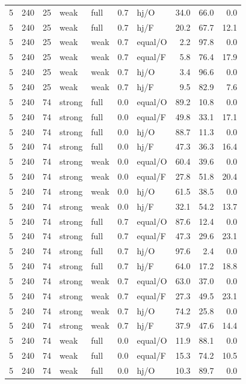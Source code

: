 {\begin{longtable}{@{}rrrllllrrr@{}}
5 & 240 & 25 & weak & full & 0.7 & hj/O & 34.0 & 66.0 & 0.0\\
5 & 240 & 25 & weak & full & 0.7 & hj/F & 20.2 & 67.7 & 12.1\\
5 & 240 & 25 & weak & weak & 0.7 & equal/O & 2.2 & 97.8 & 0.0\\
5 & 240 & 25 & weak & weak & 0.7 & equal/F & 5.8 & 76.4 & 17.9\\
5 & 240 & 25 & weak & weak & 0.7 & hj/O & 3.4 & 96.6 & 0.0\\
5 & 240 & 25 & weak & weak & 0.7 & hj/F & 9.5 & 82.9 & 7.6\\
5 & 240 & 74 & strong & full & 0.0 & equal/O & 89.2 & 10.8 & 0.0\\
5 & 240 & 74 & strong & full & 0.0 & equal/F & 49.8 & 33.1 & 17.1\\
5 & 240 & 74 & strong & full & 0.0 & hj/O & 88.7 & 11.3 & 0.0\\
5 & 240 & 74 & strong & full & 0.0 & hj/F & 47.3 & 36.3 & 16.4\\
5 & 240 & 74 & strong & weak & 0.0 & equal/O & 60.4 & 39.6 & 0.0\\
5 & 240 & 74 & strong & weak & 0.0 & equal/F & 27.8 & 51.8 & 20.4\\
5 & 240 & 74 & strong & weak & 0.0 & hj/O & 61.5 & 38.5 & 0.0\\
5 & 240 & 74 & strong & weak & 0.0 & hj/F & 32.1 & 54.2 & 13.7\\
5 & 240 & 74 & strong & full & 0.7 & equal/O & 87.6 & 12.4 & 0.0\\
5 & 240 & 74 & strong & full & 0.7 & equal/F & 47.3 & 29.6 & 23.1\\
5 & 240 & 74 & strong & full & 0.7 & hj/O & 97.6 & 2.4 & 0.0\\
5 & 240 & 74 & strong & full & 0.7 & hj/F & 64.0 & 17.2 & 18.8\\
5 & 240 & 74 & strong & weak & 0.7 & equal/O & 63.0 & 37.0 & 0.0\\
5 & 240 & 74 & strong & weak & 0.7 & equal/F & 27.3 & 49.5 & 23.1\\
5 & 240 & 74 & strong & weak & 0.7 & hj/O & 74.2 & 25.8 & 0.0\\
5 & 240 & 74 & strong & weak & 0.7 & hj/F & 37.9 & 47.6 & 14.4\\
5 & 240 & 74 & weak & full & 0.0 & equal/O & 11.9 & 88.1 & 0.0\\
5 & 240 & 74 & weak & full & 0.0 & equal/F & 15.3 & 74.2 & 10.5\\
5 & 240 & 74 & weak & full & 0.0 & hj/O & 10.3 & 89.7 & 0.0\\

\end{longtable}}
